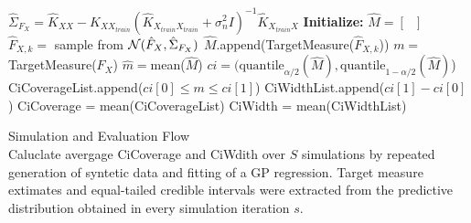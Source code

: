 \begin{algorithm}[h!]
\begin{algorithmic}[1]
        \State $\hat{\Sigma}_{F_X} = \hat{K}_{XX} -\hat{K}_{XX_{train}}(\hat{K}_{X_{train}X_{train}} + \sigma_n^2 I)^{-1}\hat{K}_{X_{train}X}$ 
        \State \textbf{Initialize:} $\hat{M} = \left[ \text{ } \right]$
            \State $\hat{F}_{X,k} = $ sample from $\operatorname{\mathcal{N}}(\hat{F}_X, \hat{\Sigma}_{F_X} )$ 
            \State $\hat{M}$.append(TargetMeasure($\hat{F}_{X, k}$)) 
        \EndFor
    \State $m =$ TargetMeasure($F_X$) 
    \State $\hat{m} = $mean($\hat{M}$)
    \State $ci = (\text{quantile}_{\alpha/2}(\hat{M}), \text{quantile}_{1-\alpha/2}(\hat{M})$) 
    \State CiCoverageList.append($ ci\left[ 0 \right] \leq m \leq ci\left[ 1 \right]$)
    \State CiWidthList.append($ci\left[ 1 \right] - ci\left[ 0 \right] $)
    \EndFor
    \State CiCoverage = mean(CiCoverageList)
    \State CiWidth = mean(CiWidthList)
\end{algorithmic}
 \caption{Simulation and Evaluation Flow \\
 Caluclate avergage CiCoverage and CiWdith over $S$ simulations by
repeated generation of syntetic data and fitting of a GP regression.
Target measure extimates and equal-tailed credible intervals were extracted from the
predictive distribution obtained in every simulation iteration $s$.}
 \label{pc:simulation-evaluation-flow}


\end{algorithm}






